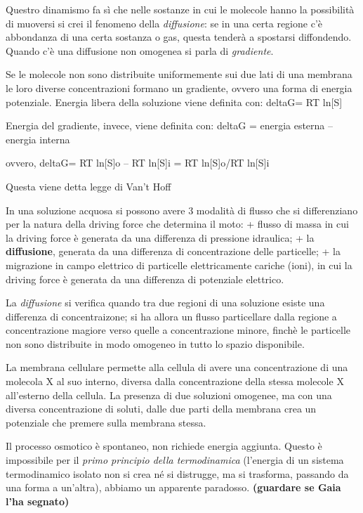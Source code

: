 \documentclass[]{article}
\begin{document}
Questro dinamismo fa sì che nelle sostanze in cui le molecole hanno la
possibilità di muoversi si crei il fenomeno della \emph{diffusione}: se
in una certa regione c'è abbondanza di una certa sostanza o gas, questa
tenderà a spostarsi diffondendo. Quando c'è una diffusione non omogenea
si parla di \emph{gradiente}.

Se le molecole non sono distribuite uniformemente sui due lati di una
membrana le loro diverse concentrazioni formano un gradiente, ovvero una
forma di energia potenziale. Energia libera della soluzione viene
definita con: deltaG= RT ln{[}S{]}

Energia del gradiente, invece, viene definita con: deltaG = energia
esterna -- energia interna

ovvero, deltaG= RT ln{[}S{]}o -- RT ln{[}S{]}i = RT ln{[}S{]}o/RT
ln{[}S{]}i

Questa viene detta legge di Van't Hoff

In una soluzione acquosa si possono avere 3 modalità di flusso che si
differenziano per la natura della driving force che determina il moto: +
flusso di massa in cui la driving force è generata da una differenza di
pressione idraulica; + la \textbf{diffusione}, generata da una
differenza di concentrazione delle particelle; + la migrazione in campo
elettrico di particelle elettricamente cariche (ioni), in cui la driving
force è generata da una differenza di potenziale elettrico.

La \emph{diffusione} si verifica quando tra due regioni di una soluzione
esiste una differenza di concentraizone; si ha allora un flusso
particellare dalla regione a concentrazione magiore verso quelle a
concentrazione minore, finchè le particelle non sono distribuite in modo
omogeneo in tutto lo spazio disponibile.

La membrana cellulare permette alla cellula di avere una concentrazione
di una molecola X al suo interno, diversa dalla concentrazione della
stessa molecole X all'esterno della cellula. La presenza di due
soluzioni omogenee, ma con una diversa concentrazione di soluti, dalle
due parti della membrana crea un potenziale che premere sulla membrana
stessa.

Il processo osmotico è spontaneo, non richiede energia aggiunta. Questo
è impossibile per il \emph{primo principio della termodinamica}
(l'energia di un sistema termodinamico isolato non si crea né si
distrugge, ma si trasforma, passando da una forma a un'altra), abbiamo
un apparente paradosso. \textbf{(guardare se Gaia l'ha segnato)}
\end{document}
